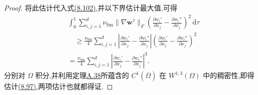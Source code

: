 \begin{lemma}[非线性黏性算子的强单调性]
\begin{proof}
将此估计代入式\hyperref[eq:smagorinsky-monotonicity-max-bound]{(8.102)},并以下界估计最大值,可得
\[
\begin{aligned}
 &\int_0^1\sum_{i,j=1}^{d}
       \nu_{\mathrm{Sm}}\|\nabla\bm{w}^{\tau}\|_F
       \left(\frac{\partial w_i'}{\partial x_j}
                    -\frac{\partial w_i''}{\partial x_j}\right)^2
                                                \,\mathrm{d}\tau\\
 &\quad\ge \frac{\nu_{\mathrm{Sm}}}{4}
       \sum_{i,j=1}^{d}
       \left|\frac{\partial w_i'}{\partial x_j}
                    -\frac{\partial w_i''}{\partial x_j}\right|
       \left(\frac{\partial w_i'}{\partial x_j}
                    -\frac{\partial w_i''}{\partial x_j}\right)^2\\
 &=\frac{\nu_{\mathrm{Sm}}}{4}\sum_{i,j=1}^{d}
       \left|\frac{\partial w_i'}{\partial x_j}
                    -\frac{\partial w_i''}{\partial x_j}\right|^3.
\end{aligned}
\]
分别对 $\Omega$ 积分,并利用定理\hyperref[thm:appendix-a-38]{A.38}所蕴含的
$C^1(\overline{\Omega})$ 在 $W^{1,3}(\Omega)$ 中的稠密性,即得估计\hyperref[eq:smagorinsky-turbulent-strong-monotonicity]{(8.97)},两项估计也就都得证.
\end{proof}
\end{lemma}

